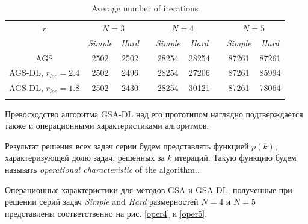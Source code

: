 \documentclass[runningheads]{llncs}
\begin{document}
\begin{table}
	\caption{Average number of iterations}
	\label{tab:1}
	\center
	\begin{tabular}{ccccccccc}
		\hline\noalign{\smallskip}
		$r$ & \multicolumn{2}{c}{$N=3$} & & \multicolumn{2}{c}{$N=4$} & & \multicolumn{2}{c}{$N=5$}  \\
		\noalign{\smallskip} \cline{2-3} \cline{5-6} \cline{8-9} \noalign{\smallskip}
		 & \textit{Simple} & \textit{Hard} & & \textit{Simple} & \textit{Hard} & & \textit{Simple} & \textit{Hard}  \\
		\noalign{\smallskip} \hline \noalign{\smallskip}
									AGS	&	2502	&	2502	&	&	28254	&	28254	&	&	87261	&	87261	\\
AGS-DL, $r_{loc}=2.4$	&	2502	&	2496	&	&	28254	&	27206	&	&	87261	&	85994	\\
AGS-DL, $r_{loc}=1.8$	&	2502	&	2430	&	&	28254	&	30121	&	&	87261	&	78064	\\
		\noalign{\smallskip}\hline
	\end{tabular}
\end{table}

Превосходство алгоритма GSA-DL над его прототипом наглядно подтверждается также и операционными характеристиками алгоритмов.  


Результат решения всех задач серии будем представлять функцией $p(k)$, характеризующей долю задач, решенных за $k$ итераций. Такую функцию будем называть \textit{operational characteristic} of the algorithm..

Операционные характеристики для методов GSA и GSA-DL, полученные при решении серий задач \textit{Simple} and \textit{Hard} размерностей $N=4$ и $N=5$ представлены соответственно на рис. \ref{oper4} и \ref{oper5}.
\end{document}
